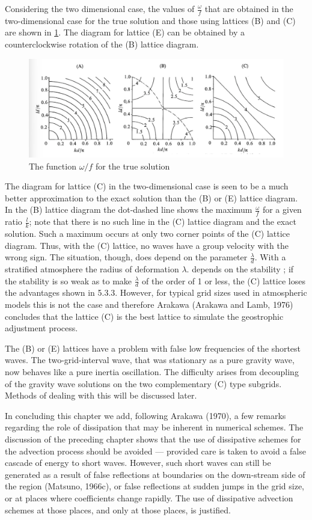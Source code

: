 Considering the two dimensional case, the values of $\frac{\omega}{f}$ that are obtained in the two-dimensional case for the true solution and those using lattices (B) and (C) are shown in \ref{fig:5.3.3}. The diagram for lattice (E) can be obtained by a counterclockwise rotation of the (B) lattice diagram.
\begin{figure}[h]
    \centering
    \includegraphics[width=0.5\linewidth]{uploads/Screenshot 2024-11-14 124824.png}
    \caption{The function $\omega/f$ for the true solution}
    \label{fig:5.3.3}
\end{figure}
The diagram for lattice (C) in the two-dimensional case is seen to be a much better approximation to the exact solution than the (B) or (E) lattice diagram. In the (B) lattice diagram the dot-dashed line shows the maximum $\frac{\omega}{f}$ for a given ratio $\frac{l}{k}$; note that there is no such line in the (C) lattice diagram and the exact solution. Such a maximum occurs at only two corner points of the (C) lattice diagram. Thus, with the (C) lattice, no waves have a group velocity with the wrong sign. The situation, though, does depend on the parameter $\frac{\lambda}{d}$. With a stratified atmosphere the radius of deformation $\lambda$. depends on the stability ; if the stability is so weak as to make $\frac{\lambda}{d}$ of the order of 1 or less, the (C) lattice loses the advantages shown in 5.3.3. However, for typical grid sizes used in atmospheric models this is not the case and therefore Arakawa (Arakawa and Lamb, 1976) concludes that the lattice (C) is the best lattice to simulate the geostrophic adjustment process. 

The (B) or (E) lattices have a problem with false low frequencies of the shortest waves. The two-grid-interval wave, that was stationary as a pure gravity wave, now behaves like a pure inertia oscillation. The difficulty arises from decoupling of the gravity wave solutions on the two complementary (C) type subgrids. Methods of dealing with this will be discussed later.

In concluding this chapter we add, following Arakawa (1970), a few remarks regarding the role of dissipation that may be inherent in numerical schemes. The discussion of the preceding chapter shows that the use of dissipative schemes for the advection process should be avoided — provided care is taken to avoid a false cascade of energy to short waves. However, such short waves can still be generated as a result of false reflections at boundaries on the down-stream side of the region (Matsuno, 1966c), or false reflections at sudden jumps in the grid size, or at places where coefficients change rapidly. The use of dissipative advection schemes at those places, and only at those places, is justified.

